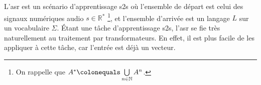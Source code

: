 \section{}
\label{sec.asr}

L'\gls{asr} est un scénario d'apprentissage \gls{s2s} où 
l'ensemble de départ est celui des signaux numériques audio \(s\in\mathbb{R}^\ast\)%
\footnote{%
   On rappelle que \(A^\ast \colonequals \bigcup\limits_{n\in\mathbb{N}} A^n\).
}, %
et l'ensemble d'arrivée est un langage \(L\) sur un vocabulaire \(\Sigma\).
Étant une tâche d'apprentissage \gls{s2s}, l'\gls{asr} se fie très naturellement au traitement par transformateurs.
En effet, il est plus facile de les appliquer à cette tâche, car l'entrée est déjà un vecteur.
